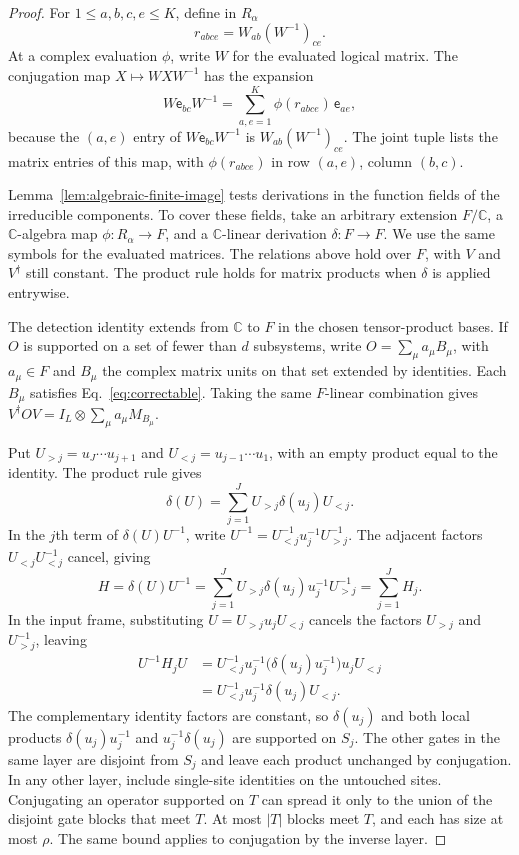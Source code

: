 \documentclass[aps,prl,reprint,notitlepage,nofootinbib,nobibnotes]{revtex4-2}
\newcommand{\id}{I}
\begin{document}
\begin{proof}
For \(1\le a,b,c,e\le K\), define in \(R_\alpha\)
\begin{equation}\label{eq:conjugation-coordinates}
 r_{abce}=W_{ab}(W^{-1})_{ce}.
\end{equation}
At a complex evaluation \(\phi\), write \(W\) for the evaluated logical
matrix. The conjugation map \(X\mapsto WXW^{-1}\) has the expansion
\[
  W\mathsf e_{bc}W^{-1}
    =\sum_{a,e=1}^{K}\phi(r_{abce})\,\mathsf e_{ae},
\]
because the \((a,e)\) entry of \(W\mathsf e_{bc}W^{-1}\) is
\(W_{ab}(W^{-1})_{ce}\). The joint tuple lists the matrix entries
of this map, with \(\phi(r_{abce})\) in row \((a,e)\), column \((b,c)\).

Lemma~\ref{lem:algebraic-finite-image} tests derivations in the function
fields of the irreducible components. To cover these fields, take an
arbitrary extension \(F/\mathbb C\), a \(\mathbb C\)-algebra map
\(\phi:R_\alpha\to F\), and a \(\mathbb C\)-linear derivation
\(\delta:F\to F\). We use the same symbols for the evaluated matrices.
The relations above hold over \(F\), with \(V\) and \(V^\dagger\) still
constant. The product rule holds for matrix products when \(\delta\)
is applied entrywise.

The detection identity extends from \(\mathbb C\) to \(F\) in the
chosen tensor-product bases. If \(O\) is supported on a set of fewer
than \(d\) subsystems, write \(O=\sum_\mu a_\mu B_\mu\), with
\(a_\mu\in F\) and \(B_\mu\) the complex matrix units on that set
extended by identities. Each \(B_\mu\) satisfies
Eq.~\eqref{eq:correctable}. Taking the same \(F\)-linear combination
gives \(V^\dagger OV=\id_L\otimes\sum_\mu a_\mu M_{B_\mu}\).

Put \(U_{>j}=u_J\cdots u_{j+1}\) and \(U_{<j}=u_{j-1}\cdots u_1\),
with an empty product equal to the identity. The product rule gives
\[
 \delta(U)=\sum_{j=1}^J U_{>j}\delta(u_j)U_{<j}.
\]
In the \(j\)th term of \(\delta(U)U^{-1}\), write
\(U^{-1}=U_{<j}^{-1}u_j^{-1}U_{>j}^{-1}\).
The adjacent factors \(U_{<j}U_{<j}^{-1}\) cancel, giving
\begin{equation}\label{eq:generator}
 H=\delta(U)U^{-1}=\sum_{j=1}^JU_{>j}\delta(u_j)u_j^{-1}U_{>j}^{-1}=\sum_{j=1}^J H_j.
\end{equation}
In the input frame, substituting \(U=U_{>j}u_jU_{<j}\) cancels
the factors \(U_{>j}\) and \(U_{>j}^{-1}\), leaving
\[
 \begin{aligned}
 U^{-1}H_jU
 &=U_{<j}^{-1}u_j^{-1}\bigl(\delta(u_j)u_j^{-1}\bigr)u_jU_{<j}\\
 &=U_{<j}^{-1}u_j^{-1}\delta(u_j)U_{<j}.
 \end{aligned}
\]
The complementary identity factors are constant, so \(\delta(u_j)\)
and both local products \(\delta(u_j)u_j^{-1}\) and
\(u_j^{-1}\delta(u_j)\) are supported on \(S_j\). The other gates
in the same layer are disjoint from \(S_j\) and leave each product
unchanged by conjugation. In any other layer, include single-site
identities on the untouched sites. Conjugating an operator supported
on \(T\) can spread it only to the union of the disjoint gate blocks
that meet \(T\). At most \(|T|\) blocks meet \(T\), and each has size
at most \(\rho\). The same bound applies to conjugation by the
inverse layer.


\end{proof}
\end{document}
